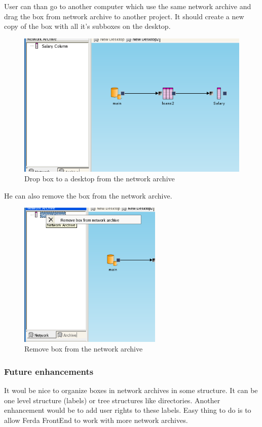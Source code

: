 \documentclass{article}
\begin{document}
User can than go to another computer which use the same network archive and drag the box from network archive to another project. It should create a new copy of the box with all it's subboxes on the desktop.
\begin{figure}
	\includegraphics[width=12cm]{network_archive_drop_to_desktop}
	\caption{Drop box to a desktop from the network archive}
\end{figure}
He can also remove the box from the network archive.
\begin{figure}
	\includegraphics[height=7cm]{network_archive_remove_box}
	\caption{Remove box from the network archive}
\end{figure}

\subsubsection{Future enhancements}
It woul be nice to organize boxes in network archives in some structure. It can be one level structure (labels) or tree structures like directories. Another enhancement would be to add user rights to these labels. Easy thing to do is to allow Ferda FrontEnd to work with more network archives.
\end{document}
